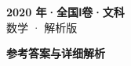 \documentclass[zihao=-4, a4paper]{ctexart}
\begin{document}
\begin{center}
  {\Large\bfseries 2020 年·全国Ⅰ卷·文科}\\[4pt]
  {\large 数学 · 解析版}
\end{center}
\medskip
{}

\clearpage
{}
\begin{center}{\Large\bfseries 参考答案与详细解析}\end{center}
\medskip

\end{document}

